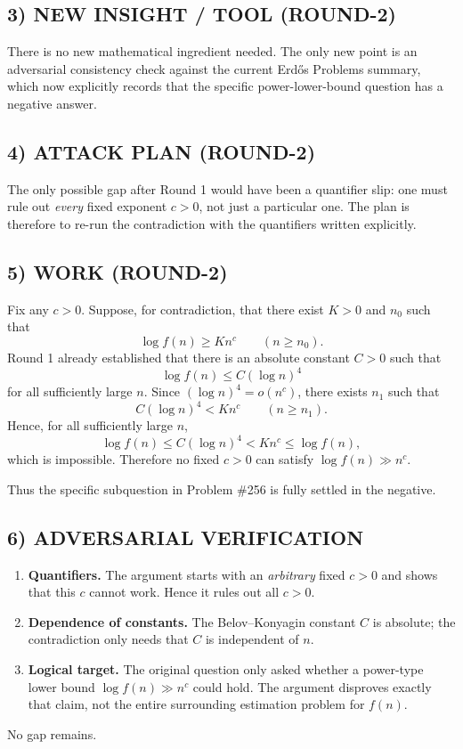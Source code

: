 \subsection*{3) NEW INSIGHT / TOOL (ROUND-2)}
There is no new mathematical ingredient needed. The only new point is an adversarial consistency check against the current Erd\H{o}s Problems summary, which now explicitly records that the specific power-lower-bound question has a negative answer.

\subsection*{4) ATTACK PLAN (ROUND-2)}
The only possible gap after Round 1 would have been a quantifier slip: one must rule out \emph{every} fixed exponent $c>0$, not just a particular one. The plan is therefore to re-run the contradiction with the quantifiers written explicitly.

\subsection*{5) WORK (ROUND-2)}
Fix any $c>0$. Suppose, for contradiction, that there exist $K>0$ and $n_0$ such that
\[
\log f(n)\ge K n^c\qquad (n\ge n_0).
\]
Round 1 already established that there is an absolute constant $C>0$ such that
\[
\log f(n)\le C(\log n)^4
\]
for all sufficiently large $n$. Since $(\log n)^4=o(n^c)$, there exists $n_1$ such that
\[
C(\log n)^4<K n^c\qquad (n\ge n_1).
\]
Hence, for all sufficiently large $n$,
\[
\log f(n)\le C(\log n)^4<K n^c\le \log f(n),
\]
which is impossible. Therefore no fixed $c>0$ can satisfy $\log f(n)\gg n^c$.

Thus the specific subquestion in Problem \#256 is fully settled in the negative.

\subsection*{6) ADVERSARIAL VERIFICATION}
\begin{enumerate}
\item \textbf{Quantifiers.} The argument starts with an \emph{arbitrary} fixed $c>0$ and shows that this $c$ cannot work. Hence it rules out all $c>0$.
\item \textbf{Dependence of constants.} The Belov--Konyagin constant $C$ is absolute; the contradiction only needs that $C$ is independent of $n$.
\item \textbf{Logical target.} The original question only asked whether a power-type lower bound $\log f(n)\gg n^c$ could hold. The argument disproves exactly that claim, not the entire surrounding estimation problem for $f(n)$.
\end{enumerate}
No gap remains.

